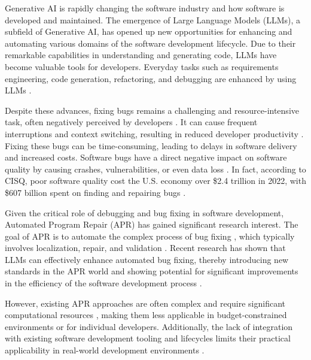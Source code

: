 Generative AI is rapidly changing the software industry and how software is developed and maintained. The emergence of Large Language Models (LLMs), a subfield of Generative AI, has opened up new opportunities for enhancing and automating various domains of the software development lifecycle. Due to their remarkable capabilities in understanding and generating code, LLMs have become valuable tools for developers. Everyday tasks such as requirements engineering, code generation, refactoring, and debugging are enhanced by using LLMs \cite{houLargeLanguageModels2024, puvvadiCodingAgentsComprehensive2025}.

Despite these advances, fixing bugs remains a challenging and resource-intensive task, often negatively perceived by developers \cite{winterHowDevelopersReally2023}. It can cause frequent interruptions and context switching, resulting in reduced developer productivity \cite{vasilescuSkyNotLimit2016}. Fixing these bugs can be time-consuming, leading to delays in software delivery and increased costs. %
Software bugs have a direct negative impact on software quality by causing crashes, vulnerabilities, or even data loss \cite{tihanyiNewEraSoftware2024}. In fact, according to CISQ, poor software quality cost the U.S. economy over \$2.4 trillion in 2022, with \$607 billion spent on finding and repairing bugs \cite{CostPoorSoftware}.

Given the critical role of debugging and bug fixing in software development, Automated Program Repair (APR) has gained significant research interest. The goal of APR is to automate the complex process of bug fixing \cite{houLargeLanguageModels2024}, which typically involves localization, repair, and validation \cite{zhangEmpiricalStudyFactors2012, leeUnifiedDebuggingApproach2024, xiaAgentlessDemystifyingLLMbased2024, zhangPATCHEmpoweringLarge2025, wangEmpiricalResearchUtilizing2025}. Recent research has shown that LLMs can effectively enhance automated bug fixing, thereby introducing new standards in the APR world and showing potential for significant improvements in the efficiency of the software development process \cite{xiaAgentlessDemystifyingLLMbased2024, liuMarsCodeAgentAInative2024, yangSWEagentAgentComputerInterfaces2024, sobaniaAnalysisAutomaticBug2023, xiaAutomatedProgramRepair2024, huCanGPTO1Kill2024}.

However, existing APR approaches are often complex and require significant computational resources \cite{rondonEvaluatingAgentbasedProgram2025}, making them less applicable in budget-constrained environments or for individual developers. Additionally, the lack of integration with existing software development tooling and lifecycles limits their practical applicability in real-world development environments \cite{chenUnveilingPitfallsUnderstanding2025, liuMarsCodeAgentAInative2024}.


